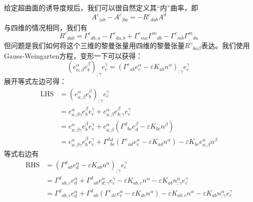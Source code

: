\documentclass[hyperref, UTF8, a4paper]{ctexart}
\begin{document}
给定超曲面的诱导度规后，我们可以很自然定义其“内”曲率，即
\begin{equation*}
	A^{c}{}_{|ab} -A^{c}{}_{|ba} =-R^{c}{}_{dab} A^{d}
\end{equation*}
与四维的情况相同，我们有
\begin{equation*}
	R^{c}{}_{dab} =\Gamma ^{c}{}_{db,a} -\Gamma ^{c}{}_{da,b} +\Gamma ^{c}{}_{ma} \Gamma ^{m}{}_{db} -\Gamma ^{c}{}_{mb} \Gamma ^{m}{}_{da}
\end{equation*}
但问题是我们如何将这个三维的黎曼张量用四维的黎曼张量$R^{\gamma }{}_{\delta \alpha \beta }$表达。我们使用Gauss-Weingarten方程，变形一下可以获得：
\begin{equation*}
	(e_{a;\beta }^{\alpha } e_{b}^{\beta } )_{;\gamma } e_{c}^{\gamma } =(\Gamma ^{c}{}_{ab} e_{c}^{\alpha } -\varepsilon K_{ab} n^{\alpha } )_{;\gamma } e_{c}^{\gamma } \ 
\end{equation*}
展开等式左边可得：
\begin{equation*}
	\begin{aligned}
		\mathrm{LHS} & =(e_{a;\beta }^{\alpha } e_{b}^{\beta } )_{;\gamma } e_{c}^{\gamma }\\
		& =e_{a;\beta \gamma }^{\alpha } e_{b}^{\beta } e_{c}^{\gamma } +e_{a;\beta }^{\alpha } e_{b;\gamma }^{\beta } e_{c}^{\gamma }\\
		& =e_{a;\beta \gamma }^{\alpha } e_{b}^{\beta } e_{c}^{\gamma } +e_{a;\beta }^{\alpha }\left( \Gamma ^{d}{}_{bc} e_{d}^{\beta } -\varepsilon K_{bc} n^{\beta }\right)\\
		& =e_{a;\beta \gamma }^{\alpha } e_{b}^{\beta } e_{c}^{\gamma } +\Gamma ^{d}{}_{bc}^{d}\left( \Gamma ^{e}{}_{ad} e_{e}^{\alpha } -\varepsilon K_{ad} n^{\alpha }\right) -\varepsilon K_{bc} e_{a;\beta }^{\alpha } n^{\beta }
	\end{aligned}
\end{equation*}
等式右边有
\begin{equation*}
	\begin{aligned}
		\mathrm{RHS} & =\left( \Gamma ^{d}{}_{ab} e_{d}^{\alpha } -\varepsilon K_{ab} n^{\alpha }\right)_{;\gamma } e_{c}^{\gamma }\\
		& =\Gamma ^{d}{}_{ab,c} e_{d}^{\alpha } +\Gamma ^{d}{}_{ab} e_{d;\gamma }^{\alpha } e_{c}^{\gamma } -\varepsilon K_{ab,c} n^{\alpha } -\varepsilon K_{ab} n_{;\gamma }^{\alpha } e_{c}^{\gamma }\\
		& =\Gamma ^{d}{}_{ab,c} e_{d}^{\alpha } +\Gamma ^{d}{}_{ab}\left( \Gamma ^{e}{}_{dc} e_{e}^{\alpha } -\varepsilon K_{dc} n^{\alpha }\right) -\varepsilon K_{ab,c} n^{\alpha } -\varepsilon K_{ab} n_{;\gamma }^{\alpha } e_{c}^{\gamma }
	\end{aligned}
\end{equation*}
\end{document}
